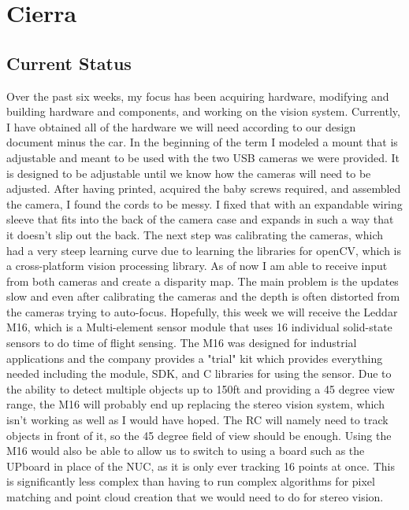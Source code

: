 \documentclass[compsoc,draftclsnofoot,onecolumn,10pt]{IEEEtran}
\begin{document}
\section{Cierra}
	\subsection{Current Status}
		Over the past six weeks, my focus has been acquiring hardware, modifying and building hardware and components, and working on the vision system. 
		Currently, I have obtained all of the hardware we will need according to our design document minus the car. 
		In the beginning of the term I modeled a mount that is adjustable and meant to be used with the two USB cameras we were provided. 
		It is designed to be adjustable until we know how the cameras will need to be adjusted. 
		After having printed, acquired the baby screws required, and assembled the camera, I found the cords to be messy. 
		I fixed that with an expandable wiring sleeve that fits into the back of the camera case and expands in such a way that it doesn't slip out the back. 
		The next step was calibrating the cameras, which had a very steep learning curve due to learning the libraries for openCV, which is a cross-platform vision processing library. 
		As of now I am able to receive input from both cameras and create a disparity map. 
		The main problem is the updates slow and even after calibrating the cameras and the depth is often distorted from the cameras trying to auto-focus. 
		Hopefully, this week we will receive the Leddar M16, which is a Multi-element sensor module that uses 16 individual solid-state sensors to do time of flight sensing. 
		The M16 was designed for industrial applications and the company provides a "trial" kit which provides everything needed including the module, SDK, and C libraries for using the sensor.
		Due to the ability to detect multiple objects up to 150ft and providing a 45 degree view range, the M16 will probably end up replacing the stereo vision system, which isn't working as well as I would have hoped. 
		The RC will namely need to track objects in front of it, so the 45 degree field of view should be enough. 
		Using the M16 would also be able to allow us to switch to using a board such as the UPboard in place of the NUC, as it is only ever tracking 16 points at once. 
		This is significantly less complex than having to run complex algorithms for pixel matching and point cloud creation that we would need to do for stereo vision. 
		
\end{document}
